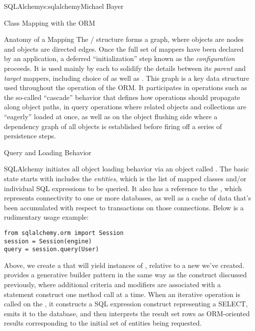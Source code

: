 \begin{aosachapter}{SQLAlchemy}{s:sqlalchemy}{Michael Bayer}
\begin{aosasect1}{Class Mapping with the ORM}
\begin{aosasect2}{Anatomy of a Mapping}
The / structure forms a graph, where  objects are nodes and
 objects are directed edges. Once the full set of
mappers have been declared by an application, a deferred ``initialization'' step
known as the \emph{configuration} proceeds. It is used mainly by each
 to solidify the details between its \emph{parent} and
\emph{target} mappers, including choice of  as well as .
This graph is a key data structure used
throughout the operation of the ORM.  It participates in operations such as the
so-called ``cascade'' behavior that defines how operations should propagate
along object paths, in query operations where related objects and collections
are ``eagerly'' loaded at once, as well as on the object flushing side where a
dependency graph of all objects is established before firing off a series of
persistence steps.

\end{aosasect2}

\end{aosasect1}

\begin{aosasect1}{Query and Loading Behavior}

SQLAlchemy initiates all object loading behavior via an object called .   The basic
state  starts with includes the \emph{entities}, which is the list of mapped classes
and/or individual SQL expressions to be queried.   It also has a reference to the
, which represents connectivity to one or
more databases, as well as a cache of data that's been accumulated with respect to
transactions on those connections.   Below is a rudimentary usage example:

\begin{verbatim}
from sqlalchemy.orm import Session
session = Session(engine)
query = session.query(User)
\end{verbatim}

Above, we create a  that will yield instances of , relative to a new
 we've created.   provides a generative builder pattern in the same
way as the  construct discussed previously, where additional criteria and
modifiers are associated with a statement construct one method call at a time.
When an iterative operation
is called on the , it constructs a SQL expression construct representing
a SELECT, emits it to the database, and then interprets the result set rows as
ORM-oriented results corresponding to the initial set of entities being requested.


\end{aosasect1}
\end{aosachapter}
